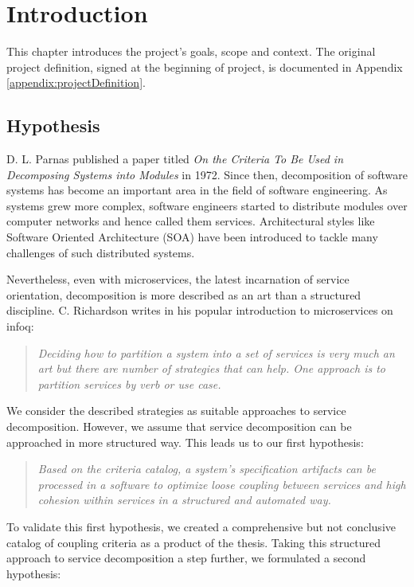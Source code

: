 \chapter{Introduction}

This chapter introduces the project's goals, scope and context. The original project definition, signed at the beginning of project, is documented in Appendix \ref{appendix:projectDefinition}.

\section{Hypothesis}

D. L. Parnas published a paper titled \textit{On the Criteria To Be Used in Decomposing Systems into Modules}\cite{parnaDecomposing} in 1972. Since then, decomposition of software systems has become an important area in the field of software engineering. As systems grew more complex, software engineers started to distribute modules over computer networks and hence called them services. Architectural styles like Software Oriented Architecture (SOA) have been introduced to tackle many challenges of such distributed systems.

Nevertheless, even with microservices, the latest incarnation of service orientation, decomposition is more described as an art than a structured discipline. C. Richardson writes in his popular introduction to microservices on \gls{infoq}:

\begin{quote}
	\textit{Deciding how to partition a system into a set of services is very much an art but there are number of strategies that can help. One approach is to partition services by verb or use case.}\cite{richardson2014microservices}
\end{quote}

We consider the described strategies as suitable approaches to service decomposition. However, we assume that service decomposition can be approached in more structured way. This leads us to our first hypothesis:

\begin{quote}
	\textit{Based on the criteria catalog, a system's specification artifacts can be processed in a software to optimize loose coupling between services and high cohesion within services in a structured and automated way.}
\end{quote}

To validate this first hypothesis, we created a comprehensive but not conclusive catalog of coupling criteria as a product of the thesis. Taking this structured approach to service decomposition a step further, we formulated a second hypothesis:

